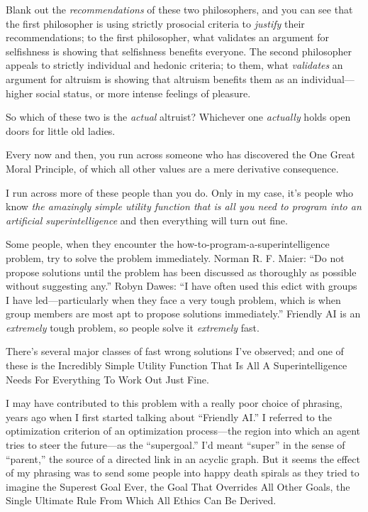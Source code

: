 {
 Blank out the \textit{recommendations} of these two philosophers,
and you can see that the first philosopher is using strictly prosocial
criteria to \textit{justify} their recommendations; to the first
philosopher, what validates an argument for selfishness is showing that
selfishness benefits everyone. The second philosopher appeals to
strictly individual and hedonic criteria; to them, what
\textit{validates} an argument for altruism is showing that altruism
benefits them as an individual---higher social status, or more intense
feelings of pleasure.}

{
 So which of these two is the \textit{actual} altruist? Whichever
one \textit{actually} holds open doors for little old ladies.}

\myendsectiontext


{
 Every now and then, you run across someone who has discovered the
One Great Moral Principle, of which all other values are a mere
derivative consequence. }

{
 I run across more of these people than you do. Only in my case,
it's people who know \textit{the amazingly simple
utility function that is all you need to program into an artificial
superintelligence} and then everything will turn out fine.}

{
 Some people, when they encounter the
how-to-program-a-superintelligence problem, try to solve the problem
immediately. Norman R. F. Maier: ``Do not propose
solutions until the problem has been discussed as thoroughly as
possible without suggesting any.'' Robyn Dawes:
``I have often used this edict with groups I have
led---particularly when they face a very tough problem, which is when
group members are most apt to propose solutions
immediately.'' Friendly AI is an \textit{extremely}
tough problem, so people solve it \textit{extremely} fast.}

{
 There's several major classes of fast wrong
solutions I've observed; and one of these is the
Incredibly Simple Utility Function That Is All A Superintelligence
Needs For Everything To Work Out Just Fine.}

{
 I may have contributed to this problem with a really poor choice
of phrasing, years ago when I first started talking about
``Friendly AI.'' I referred to the
optimization criterion of an optimization process---the region into
which an agent tries to steer the future---as the
``supergoal.'' I'd
meant ``super'' in the sense of
``parent,'' the source of a directed
link in an acyclic graph. But it seems the effect of my phrasing was to
send some people into happy death spirals as they tried to imagine the
Superest Goal Ever, the Goal That Overrides All Other Goals, the Single
Ultimate Rule From Which All Ethics Can Be Derived.}

